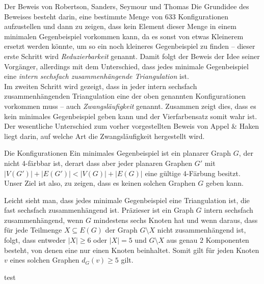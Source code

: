 \begin{chapter}{Der Beweis von Robertson, Sanders, Seymour und Thomas}
  Die Grundidee des Beweises besteht darin, eine bestimmte Menge von 633 Konfigurationen aufzustellen und dann zu zeigen, dass kein Element dieser Menge in einem minimalen Gegenbeispiel vorkommen kann, da es sonst von etwas Kleinerem ersetzt werden könnte, um so ein noch kleineres Gegenbeispiel zu finden -- dieser erste Schritt wird \textit{Reduzierbarkeit} genannt. Damit folgt der Beweis der Idee seiner Vorgänger, allerdings mit dem Unterschied, dass jedes minimale Gegenbeispiel eine \textit{intern sechsfach zusammenhängende Triangulation} ist. \\
  Im zweiten Schritt wird gezeigt, dass in jeder intern sechsfach zusammenhängenden Triangulation eine der oben genannten Konfigurationen vorkommen muss -- auch \textit{Zwangsläufigkeit} genannt. Zusammen zeigt dies, dass es kein minimales Gegenbeispiel geben kann und der Vierfarbensatz somit wahr ist. \\
  Der wesentliche Unterschied zum vorher vorgestellten Beweis von Appel \& Haken liegt darin, auf welche Art die Zwangsläufigkeit hergestellt wird.
  
  \begin{section}{Die Konfigurationen}
   Ein minimales Gegenbeispiel ist ein planarer Graph $G$, der nicht 4-färbbar ist, derart dass aber jeder planaren Graphen $G'$ mit $|V(G')| + |E(G')| < |V(G)| + |E(G)|$ eine gültige 4-Färbung besitzt. Unser Ziel ist also, zu zeigen, dass es keinen solchen Graphen $G$ geben kann. 
   
   Leicht sieht man, dass jedes minimale Gegenbeispiel eine Triangulation ist, die fast sechsfach zusammenhängend ist. Präzieser ist ein Graph $G$ intern sechsfach zusammenhängend, wenn $G$ mindestens sechs Knoten hat und wenn daraus, dass für jede Teilmenge $X \subseteq E(G)$ der Graph $G\setminus X$ nicht zusammenhängend ist, folgt, dass entweder $|X| \geq 6$ oder $|X| = 5$ und $G\setminus X$ aus genau $2$ Komponenten besteht, von denen eine nur einen Knoten beinhaltet. Somit gilt für jeden Knoten $v$ eines solchen Graphen $d_G(v) \geq 5$ gilt.
  \end{section}
  
  \begin{satz}[TETS]
   test
  \end{satz}


 
\end{chapter}
